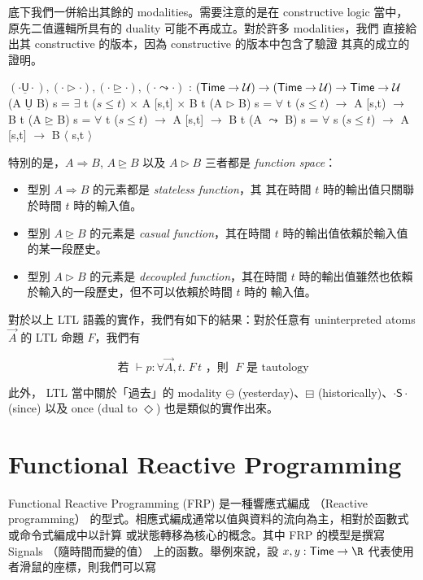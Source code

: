 \documentclass{article}
\newcommand{\U}{\mathcal{U}}
\begin{document}
  底下我們一併給出其餘的 modalities。需要注意的是在 constructive logic
  當中，原先二值邏輯所具有的 duality 可能不再成立。對於許多 modalities，我們
  直接給出其 constructive 的版本，因為 constructive 的版本中包含了驗證
  其真的成立的證明。

  \begin{code}
  $(\cdot\underline{\mathsf{U}}\cdot),(\cdot\rhd\cdot),(\cdot\unrhd\cdot),(\cdot\leadsto\cdot)$ : $(\Time\to\U)\to(\Time\to\U)\to\Time\to\U$
  (A $\underline{\mathsf{U}}$ B) s = $\exists$ {t} ($s\le t$) $\times$ A [s,t] $\times$ B t
  (A $\rhd$ B) s = $\forall$ {t} ($s\le t$) $\to$ A [s,t) $\to$ B t
  (A $\unrhd$ B) s = $\forall$ {t} ($s\le t$) $\to$ A [s,t] $\to$ B t
  (A $\leadsto$ B) s = $\forall$ {s} ($s\le t$) $\to$ A [s,t] $\to$ B $\langle$ s,t $\rangle$
  \end{code}

  特別的是，$A\Rightarrow B$, $A\unrhd B$ 以及 $A\rhd B$ 三者都是
  \emph{function space}：

  \begin{itemize}
    \item 型別 $A\Rightarrow B$ 的元素都是 \emph{stateless function}，其
    其在時間 $t$ 時的輸出值只關聯於時間 $t$ 時的輸入值。

    \item 型別 $A\unrhd B$ 的元素是 \emph{casual function}，其在時間 $t$
    時的輸出值依賴於輸入值的某一段歷史。

    \item 型別 $A\rhd B$ 的元素是 \emph{decoupled function}，其在時間 $t$
    時的輸出值雖然也依賴於輸入的一段歷史，但不可以依賴於時間 $t$ 時的
    輸入值。
  \end{itemize}

  對於以上 LTL 語義的實作，我們有如下的結果：對於任意有 uninterpreted atoms
  $\overrightarrow{A}$ 的 LTL 命題 $F$，我們有

  \[ \text{若 } \vdash p:\forall{\overrightarrow{A}},t.\; F\,t \text{ ，則 } \;F \text{ 是 tautology}\]

  此外， LTL 當中關於「過去」的 modality $\ominus$ (yesterday)、$\boxminus$
  (historically)、$\cdot\mathsf{S}\cdot$ (since) 以及 once (dual to $\Diamond$)
  也是類似的實作出來。

\section{Functional Reactive Programming}
  Functional Reactive Programming (FRP) 是一種響應式編成
  （Reactive programming）
  的型式。相應式編成通常以值與資料的流向為主，相對於函數式或命令式編成中以計算
  或狀態轉移為核心的概念。其中 FRP 的模型是撰寫 Signals （隨時間而變的值）
  上的函數。舉例來說，設 $x,y:\Time\to\R$ 代表使用者滑鼠的座標，則我們可以寫
\end{document}
